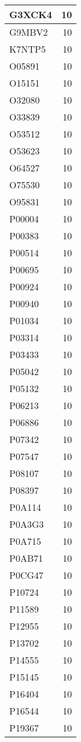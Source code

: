 \documentclass[
]{book}
\theoremstyle{definition}
\theoremstyle{definition}
\theoremstyle{definition}
\theoremstyle{definition}
\theoremstyle{remark}
\begin{document}
\begin{table}
\begin{tabular}{l|r}
\hline
G3XCK4 & 10\\
\hline
G9MBV2 & 10\\
\hline
K7NTP5 & 10\\
\hline
O05891 & 10\\
\hline
O15151 & 10\\
\hline
O32080 & 10\\
\hline
O33839 & 10\\
\hline
O53512 & 10\\
\hline
O53623 & 10\\
\hline
O64527 & 10\\
\hline
O75530 & 10\\
\hline
O95831 & 10\\
\hline
P00004 & 10\\
\hline
P00383 & 10\\
\hline
P00514 & 10\\
\hline
P00695 & 10\\
\hline
P00924 & 10\\
\hline
P00940 & 10\\
\hline
P01034 & 10\\
\hline
P03314 & 10\\
\hline
P03433 & 10\\
\hline
P05042 & 10\\
\hline
P05132 & 10\\
\hline
P06213 & 10\\
\hline
P06886 & 10\\
\hline
P07342 & 10\\
\hline
P07547 & 10\\
\hline
P08107 & 10\\
\hline
P08397 & 10\\
\hline
P0A114 & 10\\
\hline
P0A3G3 & 10\\
\hline
P0A715 & 10\\
\hline
P0AB71 & 10\\
\hline
P0CG47 & 10\\
\hline
P10724 & 10\\
\hline
P11589 & 10\\
\hline
P12955 & 10\\
\hline
P13702 & 10\\
\hline
P14555 & 10\\
\hline
P15145 & 10\\
\hline
P16404 & 10\\
\hline
P16544 & 10\\
\hline
P19367 & 10\\

\end{tabular}
\end{table}
\end{document}
